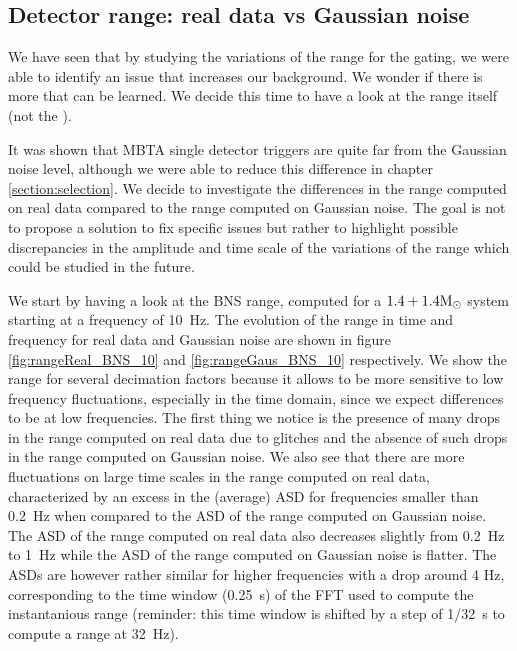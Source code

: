 

\clearpage
\newpage
\subsection{Detector range: real data vs Gaussian noise}
\label{sec:range_real_vs_gaus}

We have seen that by studying the variations of the range for the gating, we were able to identify an issue that increases our background.
We wonder if there is more that can be learned.
We decide this time to have a look at the range itself (not the \medr{}).
 
It was shown that MBTA single detector triggers are quite far from the Gaussian noise level, although we were able to reduce this difference in chapter \ref{section:selection}.
We decide to investigate the differences in the range computed on real data compared to the range computed on Gaussian noise.
The goal is not to propose a solution to fix specific issues but rather to highlight possible discrepancies in the amplitude and time scale of the variations of the range which could be studied in the future.
 
We start by having a look at the BNS range, computed for a $1.4+1.4\textrm{M$_{\odot}$}$ system starting at a frequency of \SI{10}{Hz}.
The evolution of the range in time and frequency for real data and Gaussian noise are shown in figure \ref{fig:rangeReal_BNS_10} and \ref{fig:rangeGaus_BNS_10} respectively.
We show the range for several decimation factors because it allows to be more sensitive to low frequency fluctuations, especially in the time domain, since we expect differences to be at low frequencies.
The first thing we notice is the presence of many drops in the range computed on real data due to glitches and the absence of such drops in the range computed on Gaussian noise.
We also see that there are more fluctuations on large time scales in the range computed on real data, characterized by an excess in the (average) ASD for frequencies smaller than \SI{0.2}{Hz} when compared to the ASD of the range computed on Gaussian noise.
The ASD of the range computed on real data also decreases slightly from \SI{0.2}{Hz} to \SI{1}{Hz} while the ASD of the range computed on Gaussian noise is flatter.
The ASDs are however rather similar for higher frequencies with a drop around 4 Hz, corresponding to the time window (\SI{0.25}{s}) of the FFT used to compute the instantanious range (reminder: this time window is shifted by a step of \SI{1/32}{s} to compute a range at \SI{32}{Hz}).
 
